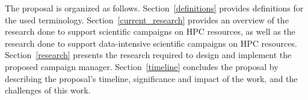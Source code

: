 The proposal is organized as follows.
Section~\ref{definitions} provides definitions for the used terminology.
Section~\ref{current_research} provides an overview of the research done to support scientific campaigns on HPC resources, as well as the research done to support data-intensive scientific campaigns on HPC resources.
Section~\ref{research} presents the research required to design and implement the proposed campaign manager.
Section~\ref{timeline} concludes the proposal by describing the proposal's timeline, significance and impact of the work, and the challenges of this work.